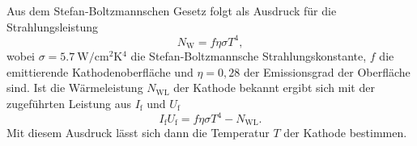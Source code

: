 \label{subsec:Temperatur_Kathode}
Aus dem Stefan-Boltzmannschen Gesetz folgt als Ausdruck für die Strahlungsleistung
\begin{equation*}
    N_\text{W} = f \eta \sigma T^4,
\end{equation*}
wobei $\sigma = \SI{5,7}{\watt\per\centi\metre\squared\kelvin^4}$ die Stefan-Boltzmannsche Strahlungskonstante, $f$ die emittierende Kathodenoberfläche und $\eta = 0,28$ der
Emissionsgrad der Oberfläche sind. Ist die Wärmeleistung $N_\text{WL}$ der Kathode bekannt ergibt sich mit der zugeführten Leistung aus $I_\text{f}$ und $U_\text{f}$
\begin{equation}
    \label{eqn:Leistung}
    I_\text{f} U_\text{f} = f \eta \sigma T^4 - N_\text{WL}.
\end{equation}
Mit diesem Ausdruck lässt sich dann die Temperatur $T$ der Kathode bestimmen.
\cite{Anleitung504}


